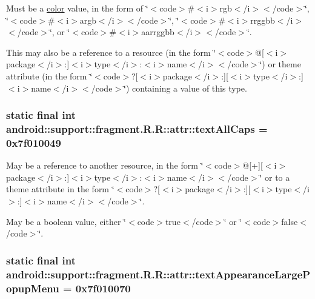 Must be a \hyperlink{classandroid_1_1support_1_1fragment_1_1_r_1_1color}{color} value, in the form of \char`\"{}$<$code$>$\#$<$i$>$rgb$<$/i$>$$<$/code$>$\char`\"{}, \char`\"{}$<$code$>$\#$<$i$>$argb$<$/i$>$$<$/code$>$\char`\"{}, \char`\"{}$<$code$>$\#$<$i$>$rrggbb$<$/i$>$$<$/code$>$\char`\"{}, or \char`\"{}$<$code$>$\#$<$i$>$aarrggbb$<$/i$>$$<$/code$>$\char`\"{}. 

This may also be a reference to a resource (in the form \char`\"{}$<$code$>$@\mbox{[}$<$i$>$package$<$/i$>$:\mbox{]}$<$i$>$type$<$/i$>$:$<$i$>$name$<$/i$>$$<$/code$>$\char`\"{}) or theme attribute (in the form \char`\"{}$<$code$>$?\mbox{[}$<$i$>$package$<$/i$>$:\mbox{]}\mbox{[}$<$i$>$type$<$/i$>$:\mbox{]}$<$i$>$name$<$/i$>$$<$/code$>$\char`\"{}) containing a value of this type. \hypertarget{classandroid_1_1support_1_1fragment_1_1_r_1_1attr_fc7325f238ecff58fa028f6e7e9837a0}{
\subsubsection[{textAllCaps}]{\setlength{\rightskip}{0pt plus 5cm}static final int android::support::fragment.R.R::attr::textAllCaps = 0x7f010049}}
\label{classandroid_1_1support_1_1fragment_1_1_r_1_1attr_fc7325f238ecff58fa028f6e7e9837a0}


May be a reference to another resource, in the form \char`\"{}$<$code$>$@\mbox{[}+\mbox{]}\mbox{[}$<$i$>$package$<$/i$>$:\mbox{]}$<$i$>$type$<$/i$>$:$<$i$>$name$<$/i$>$$<$/code$>$\char`\"{} or to a theme attribute in the form \char`\"{}$<$code$>$?\mbox{[}$<$i$>$package$<$/i$>$:\mbox{]}\mbox{[}$<$i$>$type$<$/i$>$:\mbox{]}$<$i$>$name$<$/i$>$$<$/code$>$\char`\"{}. 

May be a boolean value, either \char`\"{}$<$code$>$true$<$/code$>$\char`\"{} or \char`\"{}$<$code$>$false$<$/code$>$\char`\"{}. \hypertarget{classandroid_1_1support_1_1fragment_1_1_r_1_1attr_80adc5e9346a7ff1eabe9ba74014b947}{
\subsubsection[{textAppearanceLargePopupMenu}]{\setlength{\rightskip}{0pt plus 5cm}static final int android::support::fragment.R.R::attr::textAppearanceLargePopupMenu = 0x7f010070}}
\label{classandroid_1_1support_1_1fragment_1_1_r_1_1attr_80adc5e9346a7ff1eabe9ba74014b947}


